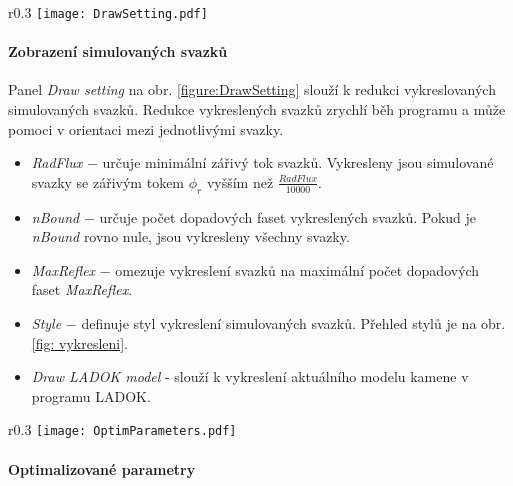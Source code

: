 \begin{wrapfigure}[14]{r}{0.3\textwidth}
\centering
\texttt{[image: DrawSetting.pdf]}
	
\caption{Panel pro výběr množiny simulovaných svazků.}
\label{figure:DrawSetting}
\end{wrapfigure}

\paragraph{Zobrazení simulovaných svazků}
\hspace{1mm}
\vspace{2mm}

Panel \textit{Draw setting} na obr. \ref{figure:DrawSetting} slouží k redukci vykreslovaných simulovaných svazků. Redukce vykreslených svazků zrychlí běh programu a může pomoci v orientaci mezi jednotlivými svazky. 

\begin{itemize}
	\item  \textit{RadFlux} $-$ určuje minimální zářivý tok svazků. Vykresleny jsou simulované svazky se zářivým tokem $\phi_r$ vyšším než $\frac{\mathit{RadFlux}}{10000}$. 
	
	\item \textit{nBound} $-$ určuje počet dopadových faset vykreslených svazků. Pokud je \textit{nBound} rovno nule, jsou vykresleny všechny svazky.
	
	\item \textit{MaxReflex} $-$ omezuje vykreslení svazků na maximální počet dopadových faset \textit{MaxReflex}. 
	
	\item \textit{Style} $-$ definuje styl vykreslení simulovaných svazků. Přehled stylů je na obr. \ref{fig: vykresleni}.
	
	\item \textit{Draw LADOK model} - slouží k vykreslení aktuálního modelu kamene v programu LADOK. 
\end{itemize}


\begin{wrapfigure}[8]{r}{0.3\textwidth}
\centering
\texttt{[image: OptimParameters.pdf]}
	
\caption{Panel pro volbu optimalizovaných parametrů.}
\label{figure:OptimParameters}
\end{wrapfigure}

\paragraph{Optimalizované parametry}
\hspace{1mm}
\vspace{2mm}

